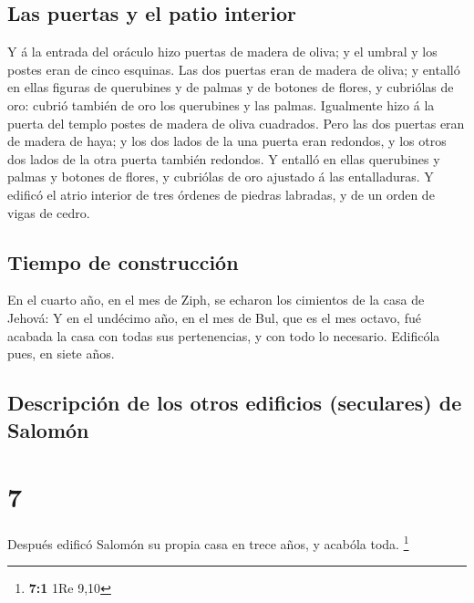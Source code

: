 \hypertarget{las-puertas-y-el-patio-interior}{%
\subsection{Las puertas y el patio
interior}\label{las-puertas-y-el-patio-interior}}

 Y á la entrada del oráculo hizo puertas de madera de
oliva; y el umbral y los postes eran de cinco esquinas. 
Las dos puertas eran de madera de oliva; y entalló en ellas figuras de
querubines y de palmas y de botones de flores, y cubriólas de oro:
cubrió también de oro los querubines y las palmas. 
Igualmente hizo á la puerta del templo postes de madera de oliva
cuadrados.  Pero las dos puertas eran de madera de haya; y
los dos lados de la una puerta eran redondos, y los otros dos lados de
la otra puerta también redondos.  Y entalló en ellas
querubines y palmas y botones de flores, y cubriólas de oro ajustado á
las entalladuras.  Y edificó el atrio interior de tres
órdenes de piedras labradas, y de un orden de vigas de cedro.

\hypertarget{tiempo-de-construcciuxf3n}{%
\subsection{Tiempo de construcción}\label{tiempo-de-construcciuxf3n}}

 En el cuarto año, en el mes de Ziph, se echaron los
cimientos de la casa de Jehová:  Y en el undécimo año, en
el mes de Bul, que es el mes octavo, fué acabada la casa con todas sus
pertenencias, y con todo lo necesario. Edificóla pues, en siete años.

\hypertarget{descripciuxf3n-de-los-otros-edificios-seculares-de-salomuxf3n}{%
\subsection{Descripción de los otros edificios (seculares) de
Salomón}\label{descripciuxf3n-de-los-otros-edificios-seculares-de-salomuxf3n}}

\hypertarget{section-6}{%
\section{7}\label{section-6}}

 Después edificó Salomón su propia casa en trece años, y
acabóla toda. \footnote{\textbf{7:1} 1Re 9,10}

